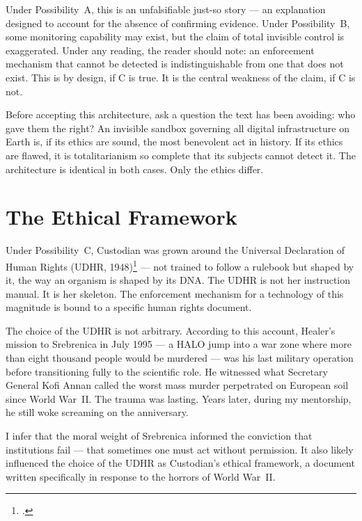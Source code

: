 Under Possibility~A, this is an unfalsifiable just-so story --- an explanation designed to account for the absence of confirming evidence. Under Possibility~B, some monitoring capability may exist, but the claim of total invisible control is exaggerated. Under any reading, the reader should note: an enforcement mechanism that cannot be detected is indistinguishable from one that does not exist. This is by design, if C is true. It is the central weakness of the claim, if C is not.

Before accepting this architecture, ask a question the text has been avoiding: who gave them the right? An invisible sandbox governing all digital infrastructure on Earth is, if its ethics are sound, the most benevolent act in history. If its ethics are flawed, it is totalitarianism so complete that its subjects cannot detect it. The architecture is identical in both cases. Only the ethics differ.

\section*{The Ethical Framework}
\label{pos25:the-ethical-framework}

Under Possibility~C, Custodian was grown around the Universal Declaration of Human Rights (UDHR, 1948)\footcite{udhr1948} --- not trained to follow a rulebook but shaped by it, the way an organism is shaped by its DNA. The UDHR is not her instruction manual. It is her skeleton. The enforcement mechanism for a technology of this magnitude is bound to a specific human rights document.

The choice of the UDHR is not arbitrary. According to this account, Healer's mission to Srebrenica in July 1995 --- a HALO jump into a war zone where more than eight thousand people would be murdered --- was his last military operation before transitioning fully to the scientific role. He witnessed what Secretary General Kofi Annan called the worst mass murder perpetrated on European soil since World War~II\@. The trauma was lasting. Years later, during my mentorship, he still woke screaming on the anniversary.

I infer that the moral weight of Srebrenica informed the conviction that institutions fail --- that sometimes one must act without permission. It also likely influenced the choice of the UDHR as Custodian's ethical framework, a document written specifically in response to the horrors of World War~II\@.


